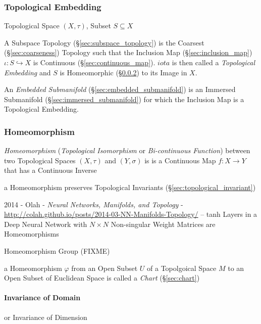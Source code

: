 \subsubsection{Topological Embedding}\label{sec:topological_embedding}

Topological Space $(X,\tau)$, Subset $S \subseteq X$

A Subspace Topology (\S\ref{sec:subspace_topology}) is the Coarsest
(\S\ref{sec:coarseness}) Topology such that the Inclusion Map
(\S\ref{sec:inclusion_map}) $\iota : S \hookrightarrow X$ is
Continuous (\S\ref{sec:continuous_map}). $iota$ is then called a
\emph{Topological Embedding} and $S$ is Homeomorphic
(\S\ref{sec:homeomorphism}) to its Image in $X$.

An \emph{Embedded Submanifold} (\S\ref{sec:embedded_submanifold}) is an
Immersed Submanifold (\S\ref{sec:immersed_submanifold}) for which the Inclusion
Map is a Topological Embedding.



\subsubsection{Homeomorphism}\label{sec:homeomorphism}

\emph{Homeomorphism} (\emph{Topological Isomorphism} or \emph{Bi-continuous
  Function}) between two Topological Spaces $(X, \tau)$ and $(Y, \sigma)$ is is
a Continuous Map $f : X \rightarrow Y$ that has a Continuous Inverse

a Homeomorphism preserves Topological Invariants
(\S\ref{sec:topological_invariant})

2014 - Olah - \emph{Neural Networks, Manifolds, and Topology} -
\url{http://colah.github.io/posts/2014-03-NN-Manifolds-Topology/} -- tanh Layers
in a Deep Neural Network with $N \times N$ Non-singular Weight Matrices are
Homeomorphisms

Homeomorphism Group (FIXME)

a Homeomorphism $\varphi$ from an Open Subset $U$ of a Topolgoical Space $M$ to
an Open Subset of Euclidean Space is called a \emph{Chart} (\S\ref{sec:chart})



\paragraph{Invariance of Domain}\label{sec:domain_invariance}\hfill

or Invariance of Dimension

